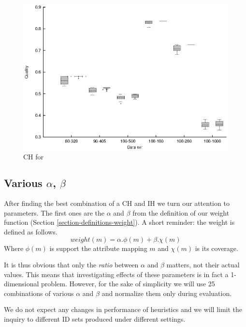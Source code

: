 \begin{figure}
  \caption{CH for }
  \label{image-experiment-ch-for-mutation}
  \centering
    \includegraphics[width=\textwidth]{images/experiments/ch-for-mutation}
\end{figure}

\subsection{Various $\alpha$, $\beta$}

After finding the best combination of a CH and IH we turn our attention to parameters. The first ones are the $\alpha$ and $\beta$ from the definition of our weight function (Section \ref{section-definitions-weight}). A short reminder: the weight is defined as follows. 
\[weight(m) = \alpha . \phi(m) + \beta . \chi(m)\]
Where $\phi(m)$ is support the attribute mapping $m$ and $\chi(m)$ is its coverage.

It is thus obvious that only the \textit{ratio} between $\alpha$ and $\beta$ matters, not their actual values. This means that investigating effects of these parameters is in fact a 1-dimensional problem. However, for the sake of simplicity we will use 25 combinations of various $\alpha$ and $\beta$ and normalize them only during evaluation.

We do not expect any changes in performance of heuristics and we will limit the inquiry to different ID sets produced under different settings.

